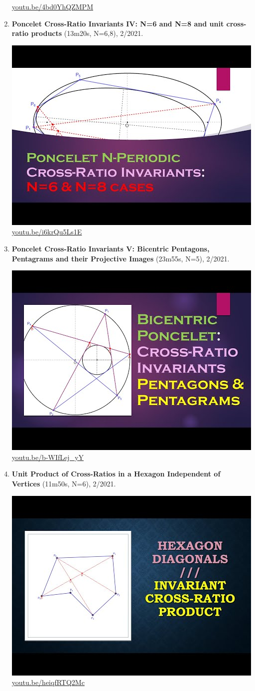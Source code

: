\documentclass[12pt]{amsart}
\begin{document}
\begin{enumerate}[resume]
\begin{center}
\href{https://youtu.be/4bd0YhQZMPM}{\url{youtu.be/4bd0YhQZMPM}}\end{center}
% 
\item \textbf{Poncelet Cross-Ratio Invariants IV: N=6 and N=8 and unit cross-ratio products} (13m20s, N=6,8), 2/2021. 
\begin{center}\includegraphics[width=.5\textwidth]{pics/i6krQu5Ls1E.jpg} \\ 
\href{https://youtu.be/i6krQu5Ls1E}{\url{youtu.be/i6krQu5Ls1E}}\end{center}
% 
\item \textbf{Poncelet Cross-Ratio Invariants V: Bicentric Pentagons, Pentagrams and their Projective Images} (23m55s, N=5), 2/2021. 
\begin{center}\includegraphics[width=.5\textwidth]{pics/b-WIfLej_yY.jpg} \\ 
\href{https://youtu.be/b-WIfLej_yY}{\url{youtu.be/b-WIfLej\_yY}}\end{center}
% 
\item \textbf{Unit Product of Cross-Ratios in a Hexagon Independent of Vertices} (11m50s, N=6), 2/2021. 
\begin{center}\includegraphics[width=.5\textwidth]{pics/heiqfRTQ2Mc.jpg} \\ 
\href{https://youtu.be/heiqfRTQ2Mc}{\url{youtu.be/heiqfRTQ2Mc}}\end{center}
% 
\end{enumerate}
\end{document}
